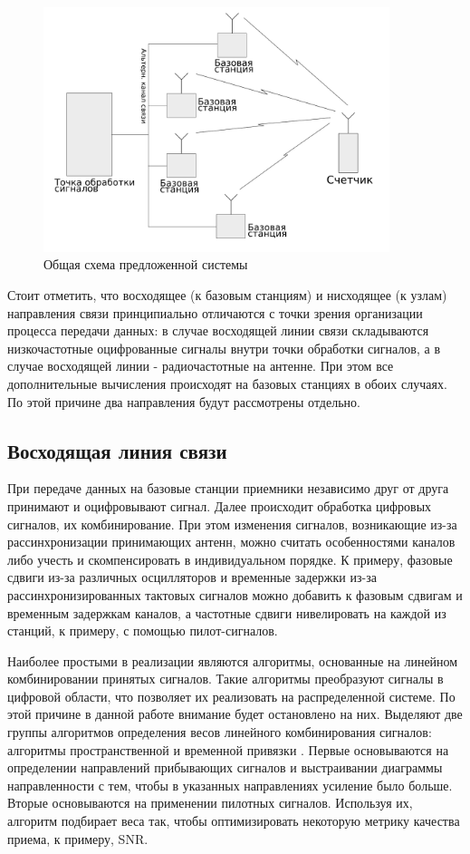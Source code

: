 \documentclass[a4paper,12pt,oneside]{scrartcl}
\begin{document}
\begin{figure}[!htb]
    \centering
    \includegraphics[width=0.9\textwidth]{pics/generalscheme.png}
    \caption{Общая схема предложенной системы}
    \label{fig:GenScheme}
\end{figure}

Стоит отметить, что восходящее (к базовым станциям) и нисходящее (к узлам) направления связи принципиально отличаются с точки зрения организации процесса передачи данных: в случае восходящей линии связи складываются низкочастотные оцифрованные сигналы внутри точки обработки сигналов, а в случае восходящей линии - радиочастотные на антенне. 
При этом все дополнительные вычисления происходят на базовых станциях в обоих случаях. По этой причине два направления будут рассмотрены отдельно.


\subsection{Восходящая линия связи}

При передаче данных на базовые станции приемники независимо друг от друга принимают и оцифровывают сигнал. 
Далее происходит обработка цифровых сигналов, их комбинирование. 
При этом изменения сигналов, возникающие из-за рассинхронизации принимающих антенн, можно считать особенностями каналов либо учесть и скомпенсировать в индивидуальном порядке. 
К примеру, фазовые сдвиги из-за различных осцилляторов и временные задержки из-за рассинхронизированных тактовых сигналов можно добавить к фазовым сдвигам и временным задержкам каналов, а частотные сдвиги нивелировать на каждой из станций, к примеру, с помощью пилот-сигналов\cite{A3}. 

Наиболее простыми в реализации являются алгоритмы, основанные на линейном комбинировании принятых сигналов. 
Такие алгоритмы преобразуют сигналы в цифровой области, что позволяет их реализовать на распределенной системе. 
По этой причине в данной работе внимание будет остановлено на них.
Выделяют две группы алгоритмов определения весов линейного комбинирования сигналов: алгоритмы пространственной и временной привязки \cite{B1}. 
Первые основываются на определении направлений прибывающих сигналов и выстраивании диаграммы направленности с тем, чтобы в указанных направлениях усиление было больше. 
Вторые основываются на применении пилотных сигналов. 
Используя их, алгоритм подбирает веса так, чтобы оптимизировать некоторую метрику качества приема, к примеру, SNR.
\end{document}
